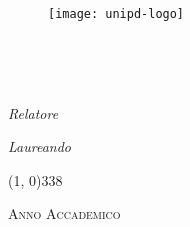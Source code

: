 \begin{titlepage}

\begin{center}

\begin{LARGE}
\textbf{\myUni}\\
\end{LARGE}

\vspace{10pt}

\begin{Large}
\textsc{\myDepartment}\\
\end{Large}

\vspace{10pt}

\begin{large}
\textsc{\myFaculty}\\
\end{large}

\vspace{50pt}
\begin{figure}[htbp]
\begin{center}
\texttt{[image: unipd-logo]}
\end{center}
\end{figure}
\vspace{15pt}

\begin{LARGE}
\begin{center}
\textbf{\myTitle}\\
\end{center}
\end{LARGE}

\vspace{10pt}

\begin{large}
\textsl{\myDegree}\\
\end{large}

\vspace{30pt}

\begin{large}
\begin{flushleft}
\textit{Relatore} \\
\vspace{5pt}
\profTitle \myProf
\end{flushleft}

\vspace{-43pt}

\begin{flushright}
\textit{Laureando} \\
\vspace{5pt}
\myName
\end{flushright}
\end{large}

\vspace{70pt}

\line(1, 0){338} \\
\begin{normalsize}
\textsc{Anno Accademico \myAA}
\end{normalsize}

\end{center}
\end{titlepage} 